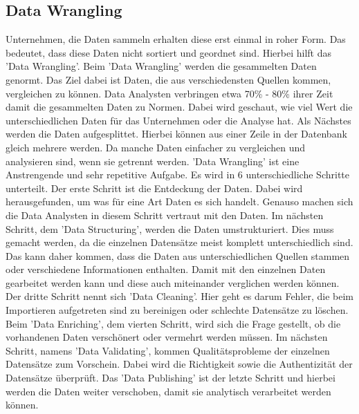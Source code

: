 \subsection{Data Wrangling}
Unternehmen, die Daten sammeln erhalten diese erst einmal in roher Form. Das bedeutet, dass diese Daten nicht sortiert und geordnet sind. Hierbei hilft das 'Data Wrangling'. Beim 'Data Wrangling' werden die gesammelten Daten genormt. Das Ziel dabei ist Daten,  die aus verschiedensten Quellen kommen, vergleichen zu können. Data Analysten verbringen etwa 70\% - 80\% ihrer Zeit damit die gesammelten Daten zu Normen. Dabei wird geschaut, wie viel Wert die unterschiedlichen Daten für das Unternehmen oder die Analyse hat. Als Nächstes werden die Daten aufgesplittet. Hierbei können aus einer Zeile in der Datenbank gleich mehrere werden. Da manche Daten einfacher zu vergleichen und analysieren sind, wenn sie getrennt werden. 
\newline
'Data Wrangling' ist eine Anstrengende und sehr repetitive Aufgabe. Es wird in 6 unterschiedliche Schritte unterteilt. Der erste Schritt ist die Entdeckung der Daten. Dabei wird herausgefunden, um was für eine Art Daten es sich handelt. Genauso machen sich die Data Analysten in diesem Schritt vertraut mit den Daten.
\newline
Im nächsten Schritt, dem 'Data Structuring', werden die Daten umstrukturiert. Dies muss gemacht werden, da die einzelnen Datensätze meist komplett unterschiedlich sind. Das kann daher kommen, dass die Daten aus unterschiedlichen Quellen stammen oder verschiedene Informationen enthalten. Damit mit den einzelnen Daten gearbeitet werden kann und diese auch miteinander verglichen werden können.
\newline 
Der dritte Schritt nennt sich 'Data Cleaning'. Hier geht es darum Fehler, die beim Importieren aufgetreten sind zu bereinigen oder schlechte Datensätze zu löschen. 
\newline 
Beim 'Data Enriching', dem vierten Schritt, wird sich die Frage gestellt, ob die vorhandenen Daten verschönert oder vermehrt werden müssen.
\newline
Im nächsten Schritt, namens 'Data Validating', kommen Qualitätsprobleme der einzelnen Datensätze zum Vorschein. Dabei wird die Richtigkeit sowie die Authentizität der Datensätze überprüft.
\newline
Das 'Data Publishing' ist der letzte Schritt und hierbei werden die Daten weiter verschoben, damit sie analytisch verarbeitet werden können. 